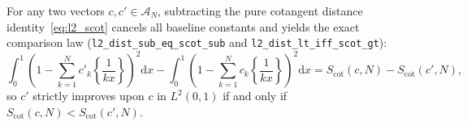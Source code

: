 \documentclass[11pt,a4paper]{article}
\theoremstyle{definition}
\newcommand{\dee}{\mathrm{d}}
\begin{document}
For any two vectors $c, c' \in \mathcal{A}_N$, subtracting the pure cotangent distance identity~\eqref{eq:l2_scot} cancels all baseline constants and yields the exact comparison law (\texttt{l2\_\allowbreak dist\_\allowbreak sub\_\allowbreak eq\_\allowbreak scot\_\allowbreak sub} and \texttt{l2\_\allowbreak dist\_\allowbreak lt\_\allowbreak iff\_\allowbreak scot\_\allowbreak gt}):
\begin{equation}
\int_0^1 \!\left(1 - \sum_{k=1}^N c'_k \left\{\frac{1}{kx}\right\}\right)^{\!2}\!\dee x
- \int_0^1 \!\left(1 - \sum_{k=1}^N c_k \left\{\frac{1}{kx}\right\}\right)^{\!2}\!\dee x
= S_{\mathrm{cot}}(c, N) - S_{\mathrm{cot}}(c', N),
\end{equation}
so $c'$ strictly improves upon $c$ in $L^2(0, 1)$ if and only if $S_{\mathrm{cot}}(c, N) < S_{\mathrm{cot}}(c', N)$.
\end{document}
